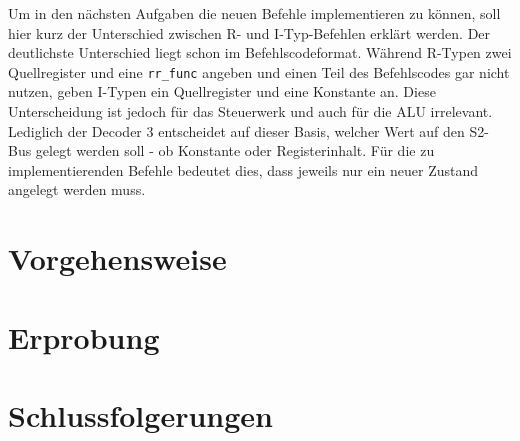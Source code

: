 \documentclass[12pt,a4paper]{scrartcl}
\begin{document}
Um in den n\"achsten Aufgaben die neuen Befehle implementieren zu k\"onnen, soll hier kurz der Unterschied zwischen R- und I-Typ-Befehlen erkl\"art werden.
Der deutlichste Unterschied liegt schon im Befehlscodeformat.
W\"ahrend R-Typen zwei Quellregister und eine \texttt{rr\_func} angeben und einen Teil des Befehlscodes gar nicht nutzen, geben I-Typen ein Quellregister und eine Konstante an.
Diese Unterscheidung ist jedoch f\"ur das Steuerwerk und auch f\"ur die ALU irrelevant.
Lediglich der Decoder 3 entscheidet auf dieser Basis, welcher Wert auf den S2-Bus gelegt werden soll - ob Konstante oder Registerinhalt.
F\"ur die zu implementierenden Befehle bedeutet dies, dass jeweils nur ein neuer Zustand angelegt werden muss.

\section{Vorgehensweise}


\section{Erprobung}

\section{Schlussfolgerungen}
\end{document}
